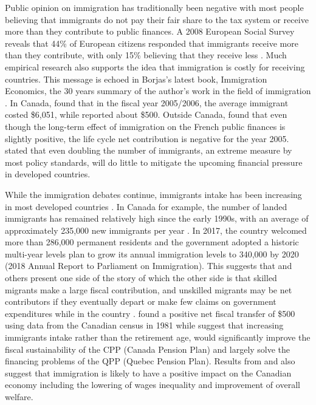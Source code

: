 \vspace{0.7em}\par
Public opinion on immigration has traditionally been negative with most people believing that immigrants do not pay their fair share to the tax system or receive more than they contribute to public finances.
A 2008 European Social Survey reveals that 44\% of European citizens responded that immigrants receive more than they contribute, with only 15\% believing that they receive less \citep{Dustmann:2014dr}.
Much empirical research also supports the idea that immigration is costly for receiving countries.
This message is echoed in Borjas's latest book, Immigration Economics, the 30 years summary of the author's work in the field of immigration \citep{Card:2016ku}.
In Canada, \citet{Grubel:2012wo} found that in the fiscal year 2005/2006, the average immigrant costed \$6,051, while \citet{Javdani:2013gu} reported about \$500.
Outside Canada, \citet{Chojnicki:2011vu} found that even though the long-term effect of immigration on the French public finances is slightly positive, the life cycle net contribution is negative for the year 2005.
\citet{Fehr:2003gq} stated that even doubling the number of immigrants, an extreme measure by most policy standards, will do little to mitigate the upcoming financial pressure in developed countries.

\vspace{0.7em}\par
While the immigration debates continue, immigrants intake has been increasing in most developed countries \citep{Card:2016ku}.
In Canada for example, the number of landed immigrants has remained relatively high since the early 1990s, with an average of approximately 235,000 new immigrants per year \citep{StatistiqueCanada:2016ud}.
In 2017, the country welcomed more than 286,000 permanent residents and the government adopted a historic multi-year levels plan to grow its annual immigration levels to 340,000 by 2020 (2018 Annual Report to Parliament on Immigration).
This suggests that \citet{Borjas:2014hr} and others present one side of the story of which the other side is that skilled migrants make a large fiscal contribution, and unskilled migrants may be net contributors if they eventually depart or make few claims on government expenditures while in the country \citep{Rowthorn:2008kk}.
\citet{Akbari:1989fh} found a positive net fiscal transfer of \$500 using data from the Canadian census in 1981 while \citet{Hering:2010tz} suggest that increasing immigrants intake rather than the retirement age, would significantly improve the fiscal sustainability of the CPP (Canada Pension Plan) and largely solve the financing problems of the QPP (Quebec Pension Plan).
Results from \citet{Ileri:2019hf} and \citet{Dungan:2013jp} also suggest that immigration is likely to have a positive impact on the Canadian economy including the lowering of wages inequality and improvement of overall welfare.

